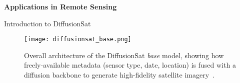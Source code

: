 


\begin{refsection}
  \begin{frame}
    \centering
    \vspace{2.5cm}
    {\LARGE \textbf{Applications in Remote Sensing}}
  \end{frame}
\end{refsection}


\begin{refsection}
  \begin{frame}{Introduction to DiffusionSat}
    \begin{figure}
      \centering
      \texttt{[image: diffusionsat\_base.png]}
      \caption{\scriptsize Overall architecture of the DiffusionSat \emph{base} model, showing how freely-available metadata (sensor type, date, location) is fused with a diffusion backbone to generate high-fidelity satellite imagery~\parencite{diffusionset2024}.}
    \end{figure}
    \bottomleftrefs
  \end{frame}
\end{refsection}

